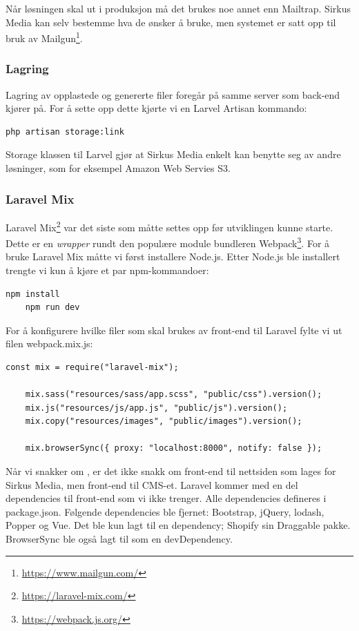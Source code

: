 Når løsningen skal ut i produksjon må det brukes noe annet enn Mailtrap. Sirkus Media kan selv bestemme hva de ønsker å bruke, men systemet er satt opp til bruk av Mailgun\footnote{\url{https://www.mailgun.com/}}.

\subsubsection{Lagring}
Lagring av opplastede og genererte filer foregår på samme server som back-end kjører på. For å sette opp dette kjørte vi en Larvel Artisan kommando:
\begin{lstlisting}[caption={Laravel Artisan kommando for å sette opp lagring av filer}, language=bash]
    php artisan storage:link
\end{lstlisting}
Storage klassen til Larvel gjør at Sirkus Media enkelt kan benytte seg av andre løsninger, som for eksempel Amazon Web Servies S3.

\subsubsection{Laravel Mix}
Laravel Mix\footnote{\url{https://laravel-mix.com/}} var det siste som måtte settes opp før utviklingen kunne starte. Dette er en \textit{wrapper} rundt den populære module bundleren Webpack\footnote{\url{https://webpack.js.org/}}. For å bruke Laravel Mix måtte vi først installere Node.js. Etter Node.js ble installert trengte vi kun å kjøre et par npm-kommandoer:
\begin{lstlisting}[caption={npm-kommando for å sette opp front-end til Laravel}, language=bash]
    npm install
    npm run dev
\end{lstlisting}

For å konfigurere hvilke filer som skal brukes av front-end til Laravel fylte vi ut filen webpack.mix.js:
\begin{lstlisting}[caption={Eksempel på oppsett av webpack.mix.js}]
    const mix = require("laravel-mix");

    mix.sass("resources/sass/app.scss", "public/css").version();
    mix.js("resources/js/app.js", "public/js").version();
    mix.copy("resources/images", "public/images").version();

    mix.browserSync({ proxy: "localhost:8000", notify: false });
\end{lstlisting}

Når vi snakker om , er det ikke snakk om front-end til nettsiden som lages for Sirkus Media, men front-end til CMS-et.
Laravel kommer med en del dependencies til front-end som vi ikke trenger. Alle dependencies defineres i package.json. Følgende dependencies ble fjernet: Bootstrap, jQuery, lodash, Popper og Vue. Det ble kun lagt til en dependency; Shopify sin Draggable pakke. BrowserSync ble også lagt til som en devDependency.

